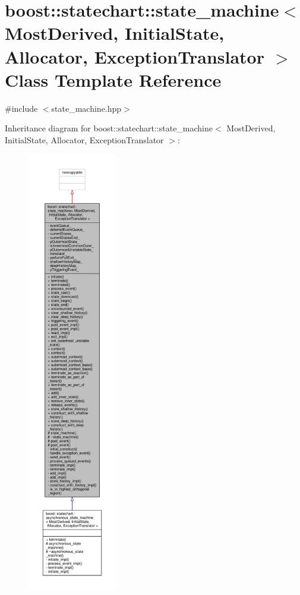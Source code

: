 \hypertarget{classboost_1_1statechart_1_1state__machine}{}\section{boost\+:\+:statechart\+:\+:state\+\_\+machine$<$ Most\+Derived, Initial\+State, Allocator, Exception\+Translator $>$ Class Template Reference}
\label{classboost_1_1statechart_1_1state__machine}


{\ttfamily \#include $<$state\+\_\+machine.\+hpp$>$}



Inheritance diagram for boost\+:\+:statechart\+:\+:state\+\_\+machine$<$ Most\+Derived, Initial\+State, Allocator, Exception\+Translator $>$\+:
\nopagebreak
\begin{figure}[H]
\begin{center}
\leavevmode
\includegraphics[height=550pt]{classboost_1_1statechart_1_1state__machine__inherit__graph}
\end{center}
\end{figure}


